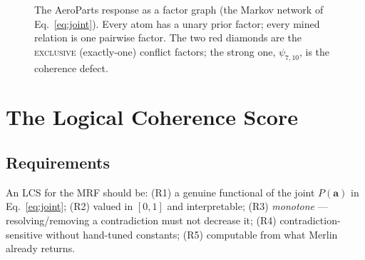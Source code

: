 \documentclass[11pt]{article}
\begin{document}
\begin{figure}[h]
\caption{The AeroParts response as a factor graph (the Markov network of
Eq.~\eqref{eq:joint}). Every atom has a unary prior factor; every mined relation is one
pairwise factor. The two red diamonds are the \textsc{exclusive} (exactly-one) conflict
factors; the strong one, $\psi_{7,10}$, is the coherence defect.}
\label{fig:mrf}
\end{figure}

\section{The Logical Coherence Score}
\label{sec:lcs}

\subsection{Requirements}
An LCS for the MRF should be: (R1) a genuine functional of the joint
$P(\mathbf a)$ in Eq.~\eqref{eq:joint}; (R2) valued in $[0,1]$ and interpretable;
(R3) \emph{monotone} --- resolving/removing a contradiction must not decrease it;
(R4) contradiction-sensitive without hand-tuned constants; (R5) computable from what Merlin
already returns.
\end{document}
